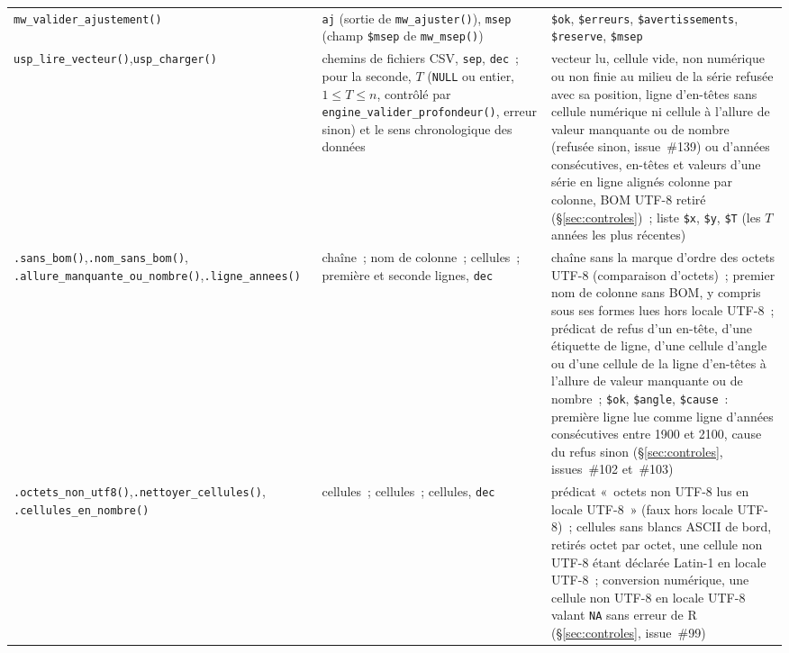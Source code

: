 \documentclass[a4paper,11pt]{article}
\newcommand{\code}[1]{\texttt{\small #1}}
\begin{document}
{\begin{longtable}{@{}p{4.6cm}p{4.0cm}p{6.2cm}@{}}
\code{mw\_valider\_ajustement()} & \code{aj} (sortie de \code{mw\_ajuster()}),
\code{msep} (champ \code{\$msep} de \code{mw\_msep()}) &
\code{\$ok}, \code{\$erreurs}, \code{\$avertissements}, \code{\$reserve},
\code{\$msep} \\
\code{usp\_lire\_vecteur()},\newline \code{usp\_charger()} & chemins de fichiers CSV,
\code{sep}, \code{dec}~; pour la seconde, $T$ (\code{NULL} ou entier, $1 \le T \le n$, contrôlé
par \code{engine\_valider\_}\newline\code{profondeur()}, erreur sinon) et le sens chronologique des
données &
vecteur lu, cellule vide, non numérique ou non finie au milieu de la série refusée avec sa
position, ligne d'en-têtes sans cellule numérique ni cellule à l'allure de valeur manquante ou
de nombre (refusée sinon, issue~\#139) ou d'années consécutives, en-têtes et valeurs
d'une série en ligne alignés colonne par colonne, BOM UTF-8 retiré (§\ref{sec:controles})~;
liste \code{\$x}, \code{\$y}, \code{\$T} (les $T$ années les plus récentes) \\
\code{.sans\_bom()},\newline \code{.nom\_sans\_bom()},\newline
\code{.allure\_manquante\_}\newline\code{ou\_nombre()},\newline \code{.ligne\_annees()} &
chaîne~; nom de colonne~; cellules~; première et seconde lignes, \code{dec} &
chaîne sans la marque d'ordre des octets UTF-8 (comparaison d'octets)~; premier nom de colonne
sans BOM, y compris sous ses formes lues hors locale UTF-8~; prédicat de refus d'un en-tête,
d'une étiquette de ligne, d'une cellule d'angle ou d'une cellule de la ligne d'en-têtes à
l'allure de valeur manquante ou de nombre~;
\code{\$ok}, \code{\$angle}, \code{\$cause}~: première ligne lue comme ligne d'années
consécutives entre 1900 et 2100, cause du refus sinon (§\ref{sec:controles}, issues~\#102
et~\#103) \\
\code{.octets\_non\_utf8()},\newline \code{.nettoyer\_cellules()},\newline
\code{.cellules\_en\_nombre()} & cellules~; cellules~; cellules, \code{dec} &
prédicat «~octets non UTF-8 lus en locale UTF-8~» (faux hors locale UTF-8)~; cellules sans
blancs ASCII de bord, retirés octet par octet, une cellule non UTF-8 étant déclarée Latin-1 en
locale UTF-8~; conversion numérique, une cellule non UTF-8 en locale UTF-8 valant \code{NA}
sans erreur de R (§\ref{sec:controles}, issue~\#99) \\

\end{longtable}}
\end{document}
